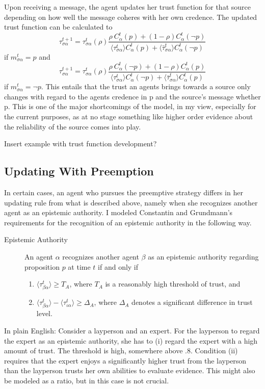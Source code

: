 \documentclass[11pt, a4paper]{article}
\newcommand{\sa}{{\sigma\alpha}}
\renewcommand{\a}{\alpha}
\begin{document}
Upon receiving a message, the agent updates her trust function for that source depending on how well the message coheres with her own credence. The updated trust function can be calculated to
\[
    \tau^{t+1}_\sa = \tau^t_\sa (\rho) \frac{\rho \: C^t_\a (p) + (1 - \rho) C^t_\a (\neg p)}
    {\langle \tau^t_\sa \rangle C^t_\a(p) + \langle \bar{\tau}^t_\sa \rangle C^t_\a(\neg p)}
\]
if $m^t_{\sa} = p$ and 
\[
    \tau^{t+1}_\sa = \tau^t_\sa (\rho) \frac{\rho \: C^t_\a (\neg p) + (1 - \rho) C^t_\a (p)}
    {\langle \tau^t_\sa \rangle C^t_\a(\neg p) + \langle \bar{\tau}^t_\sa \rangle C^t_\a(p)}
\]
if $m^t_{\sa} = \neg p$. This entails that the trust an agents brings towards a source only changes with regard to the agents credence in p and the source's message whether p. This is one of the major shortcomings of the model, in my view, especially for the current purposes, as at no stage something like higher order evidence about the reliability of the source comes into play. 

Insert example with trust function development?

\subsection{Updating With Preemption}

In certain cases, an agent who pursues the preemptive strategy differs in her updating rule from what is described above, namely when she recognizes another agent as an epistemic authority. I modeled Constantin and Grundmann's requirements for the recognition of an epistemic authority in the following way. 
\begin{description} 
    \item[Epistemic Authority] An agent $\alpha$ recognizes another agent $\beta$ as an epistemic authority regarding proposition $p$ at time $t$ if and only if  
    \begin{enumerate}[label= (\roman*)]
        \item $\langle \tau^t_{\beta\alpha} \rangle \geqslant T_A$, where $T_A$ is a reasonably high threshold of trust, and
        \item $\langle \tau^t_{\beta\alpha} \rangle - \langle \tau^t_{\iota\alpha} \rangle \geqslant \Delta_A$, where $\Delta_A$ denotes a significant difference in trust level.
    \end{enumerate}


\end{description}
    In plain English: Consider a layperson and an expert. For the layperson to regard the expert as an epistemic authority, she has to (i) regard the expert with a high amount of trust. The threshold is high, somewhere above .8. Condition (ii) requires that the expert enjoys a significantly higher trust from the layperson than the layperson trusts her own abilities to evaluate evidence. This might also be modeled as a ratio, but in this case is not crucial.
\end{document}
